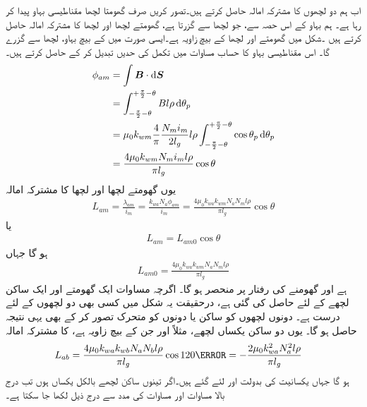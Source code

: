 اب ہم دو لچھوں کا مشترکہ امالہ حاصل کرتے ہیں۔تصور کریں صرف  گھومتا لچھا مقناطیسی بہاو پیدا کر رہا ہے۔ ہم  بہاو کے اس حصہ سے، جو  لچھا  سے گزرتا ہے، گھومتے لچھا اور  لچھا  کا مشترکہ امالہ حاصل کرتے ہیں ۔شکل   میں گھومتے اور  لچھا کے بیچ زاویہ  ہے۔ایسی صورت میں   کے بیچ بہاو،  لچھا سے گزرے گا۔ اس مقناطیسی بہاو کا حساب مساوات   میں تکمل کی حدیں تبدیل کر کے حاصل کرتے ہیں۔
\begin{gather}
\begin{aligned}
\phi_{am}&=\int \kvec{B} \cdot \dif \kvec{S}\\
&=\int_{-\frac{\pi}{2}-\theta}^{+\frac{\pi}{2}-\theta} B l \rho \dif \theta_p\\
&=\mu_0 k_{wm} \frac{4}{\pi}\frac{N_m i_m}{2 l_g} l \rho \int_{-\frac{\pi}{2}-\theta}^{+\frac{\pi}{2}-\theta} \cos \theta_p \dif \theta_p\\
&=\frac{4 \mu_0 k_{wm}  N_m i_m l \rho}{\pi l_g} \cos \theta
\end{aligned}
\end{gather}
یوں گھومتے لچھا اور  لچھا کا  مشترکہ امالہ
\begin{align}
L_{am}=\frac{\lambda_{am}}{i_m}=\frac{k_{wa} N_a \phi_{am}}{i_m}=\frac{4 \mu_0 k_{wa} k_{wm} N_a N_m l \rho}{\pi l_g} \cos \theta
\end{align}
یا
\begin{align}\label{مساوات_معاصر_ساکن_گھومتا_مشترکہ_امالہ}
L_{am}=L_{am0} \cos \theta
\end{align}
ہو گا جہاں
\begin{align}
L_{am0}=\frac{4 \mu_0 k_{wa} k_{wm} N_a N_m l \rho}{\pi l_g} 
\end{align}
ہے اور   گھومنے کی رفتار پر منحصر ہو گا۔ اگرچہ مساوات  ایک گھومتے اور ایک ساکن لچھے کے لئے حاصل کی گئی  ہے،  درحقیقت یہ  شکل  میں کسی بھی دو لچھوں کے لئے درست ہے۔  دونوں لچھوں کو ساکن یا دونوں کو متحرک تصور کر کے بھی یہی نتیجہ حاصل ہو گا۔  یوں  دو ساکن  یکساں لچھے، مثلاً  اور  جن کے بیچ   زاویہ ہے،  کا  مشترکہ امالہ
\begin{align}
L_{ab}&=\frac{4 \mu_0 k_{wa} k_{wb} N_a N_b l \rho}{\pi l_g} \cos 120\degree=-\frac{2 \mu_0 k_{wa}^2  N_a^2 l \rho}{\pi l_g}
\end{align}
ہو گا جہاں یکسانیت کی  بدولت   اور  لئے گئے ہیں۔اگر تینوں ساکن لچھے بالکل یکساں ہوں  تب درج بالا مساوات اور مساوات  کی مدد سے درج ذیل  لکھا جا سکتا ہے۔ 

